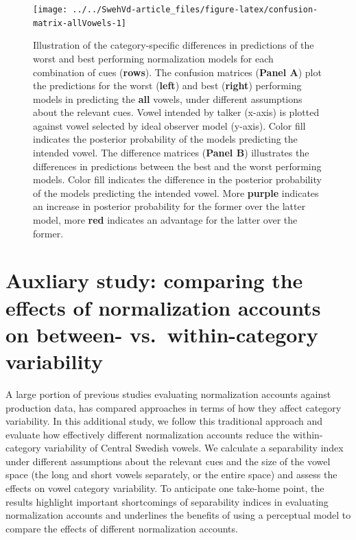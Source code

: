 \documentclass[utf8]{frontiers_suppmat} %
\begin{document}
\begin{landscape}

\begin{figure}

{\centering \texttt{[image: ../../SwehVd-article\_files/figure-latex/confusion-matrix-allVowels-1]} 

}

\caption{Illustration of the category-specific differences in predictions of the worst and best performing normalization models for each combination of cues (\textbf{rows}). The confusion matrices (\textbf{Panel A}) plot the predictions for the worst (\textbf{left}) and best (\textbf{right}) performing models in predicting the \textbf{all} vowels, under different assumptions about the relevant cues. Vowel intended by talker (x-axis) is plotted against vowel selected by ideal observer model (y-axis). Color fill indicates the posterior probability of the models predicting the intended vowel. The difference matrices (\textbf{Panel B}) illustrates the differences in predictions between the best and the worst performing models. Color fill indicates the difference in the posterior probability of the models predicting the intended vowel. More \textbf{purple} indicates an increase in posterior probability for the former over the latter model, more \textbf{red} indicates an advantage for the latter over the former.}\label{fig:confusion-matrix-allVowels}
\end{figure}

\end{landscape}

\hypertarget{sec:auxiliaryStudy}{%
\section{Auxliary study: comparing the effects of normalization accounts on between- vs.~within-category variability}\label{sec:auxiliaryStudy}}

A large portion of previous studies evaluating normalization accounts against production data, has compared approaches in terms of how they affect category variability. In this additional study, we follow this traditional approach and evaluate how effectively different normalization accounts reduce the within-category variability of Central Swedish vowels. We calculate a separability index under different assumptions about the relevant cues and the size of the vowel space (the long and short vowels separately, or the entire space) and assess the effects on vowel category variability. To anticipate one take-home point, the results highlight important shortcomings of separability indices in evaluating normalization accounts and underlines the benefits of using a perceptual model to compare the effects of different normalization accounts.
\end{document}
